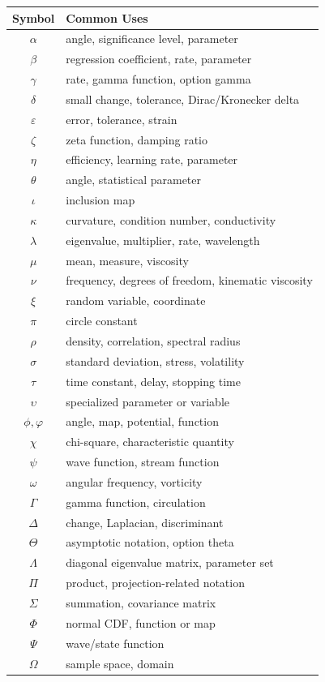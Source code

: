 \begin{center}
\begin{tabular}{c|l}
\textbf{Symbol} & \textbf{Common Uses} \\ \hline
\(\alpha\) & angle, significance level, parameter \\
\(\beta\) & regression coefficient, rate, parameter \\
\(\gamma\) & rate, gamma function, option gamma \\
\(\delta\) & small change, tolerance, Dirac/Kronecker delta \\
\(\varepsilon\) & error, tolerance, strain \\
\(\zeta\) & zeta function, damping ratio \\
\(\eta\) & efficiency, learning rate, parameter \\
\(\theta\) & angle, statistical parameter \\
\(\iota\) & inclusion map \\
\(\kappa\) & curvature, condition number, conductivity \\
\(\lambda\) & eigenvalue, multiplier, rate, wavelength \\
\(\mu\) & mean, measure, viscosity \\
\(\nu\) & frequency, degrees of freedom, kinematic viscosity \\
\(\xi\) & random variable, coordinate \\
\(\pi\) & circle constant \\
\(\rho\) & density, correlation, spectral radius \\
\(\sigma\) & standard deviation, stress, volatility \\
\(\tau\) & time constant, delay, stopping time \\
\(\upsilon\) & specialized parameter or variable \\
\(\phi,\varphi\) & angle, map, potential, function \\
\(\chi\) & chi-square, characteristic quantity \\
\(\psi\) & wave function, stream function \\
\(\omega\) & angular frequency, vorticity \\
\(\Gamma\) & gamma function, circulation \\
\(\Delta\) & change, Laplacian, discriminant \\
\(\Theta\) & asymptotic notation, option theta \\
\(\Lambda\) & diagonal eigenvalue matrix, parameter set \\
\(\Pi\) & product, projection-related notation \\
\(\Sigma\) & summation, covariance matrix \\
\(\Phi\) & normal CDF, function or map \\
\(\Psi\) & wave/state function \\
\(\Omega\) & sample space, domain
\end{tabular}
\end{center}

